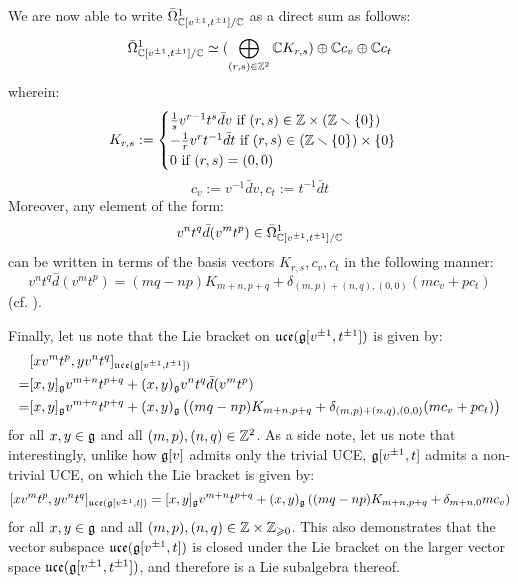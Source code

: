 \begin{example}
            We are now able to write $\bar{\Omega}^1_{\mathbb{C}[v^{\pm 1}, t^{\pm 1}]/\mathbb{C}}$ as a direct sum as follows:
                $$\bar{\Omega}^1_{\mathbb{C}[v^{\pm 1}, t^{\pm 1}]/\mathbb{C}} \simeq ( \bigoplus_{(r, s) \in \mathbb{Z}^2} \mathbb{C} K_{r, s}) \oplus \mathbb{C} c_v \oplus \mathbb{C} c_t$$
            wherein:
                $$
                    K_{r, s} :=
                    \begin{cases}
                        \text{$\frac1s v^{r - 1} t^s \bar{d}v$ if $(r, s) \in \Z \x (\Z \setminus \{0\})$}
                        \\
                        \text{$-\frac1r v^r t^{-1} \bar{d}t$ if $(r, s) \in (\Z \setminus \{0\}) \x \{0\}$}
                        \\
                        \text{$0$ if $(r, s) = (0, 0)$}
                    \end{cases}
                $$
                $$c_v := v^{-1} \bar{d}v, c_t := t^{-1} \bar{d}t$$
            Moreover, any element of the form:
                $$v^n t^q \bar{d}(v^m t^p) \in \bar{\Omega}^1_{\mathbb{C}[v^{\pm 1}, t^{\pm 1}]/\mathbb{C}}$$
            can be written in terms of the basis vectors $K_{r, s}, c_v, c_t$ in the following manner:
                $$v^n t^q \bar{d}(v^m t^p) = (mq - np) K_{m + n, p + q} + \delta_{(m, p) + (n, q), (0, 0)} ( m c_v + p c_t )$$
            (cf. \cite[p. 35]{wendlandt_formal_shift_operators_on_yangian_doubles}).

            Finally, let us note that the Lie bracket on $\mathfrak{uce}(\mathfrak{g}[v^{\pm 1}, t^{\pm 1}])$ is given by:
                $$
                    \begin{aligned}
                        & [x v^m t^p, y v^n t^q]_{\mathfrak{uce}(\mathfrak{g}[v^{\pm 1}, t^{\pm 1}])}
                        \\
                        = & [x, y]_{\mathfrak{g}} v^{m + n} t^{p + q} + (x, y)_{\mathfrak{g}} v^n t^q \bar{d}(v^m t^p)
                        \\
                        = & [x, y]_{\mathfrak{g}} v^{m + n} t^{p + q} + (x, y)_{\mathfrak{g}} \left( (mq - np) K_{m + n, p + q} + \delta_{(m, p) + (n, q), (0, 0)} ( m c_v + p c_t ) \right)
                    \end{aligned}
                $$
            for all $x, y \in \mathfrak{g}$ and all $(m, p), (n, q) \in \mathbb{Z}^2$. As a side note, let us note that interestingly, unlike how $\mathfrak{g}[v]$ admits only the trivial UCE, $\mathfrak{g}[v^{\pm 1}, t]$ admits a non-trivial UCE, on which the Lie bracket is given by:
                $$[x v^m t^p, y v^n t^q]_{\mathfrak{uce}(\mathfrak{g}[v^{\pm 1}, t])} = [x, y]_{\mathfrak{g}} v^{m + n} t^{p + q} + (x, y)_{\mathfrak{g}} \left( (mq - np) K_{m + n, p + q} + \delta_{m + n, 0} m c_v \right)$$
            for all $x, y \in \mathfrak{g}$ and all $(m, p), (n, q) \in \Z \x \Z_{\geq 0}$. This also demonstrates that the vector subspace $\mathfrak{uce}(\mathfrak{g}[v^{\pm 1}, t])$ is closed under the Lie bracket on the larger vector space $\mathfrak{uce}(\mathfrak{g}[v^{\pm 1}, t^{\pm 1}])$, and therefore is a Lie subalgebra thereof.
        \end{example}